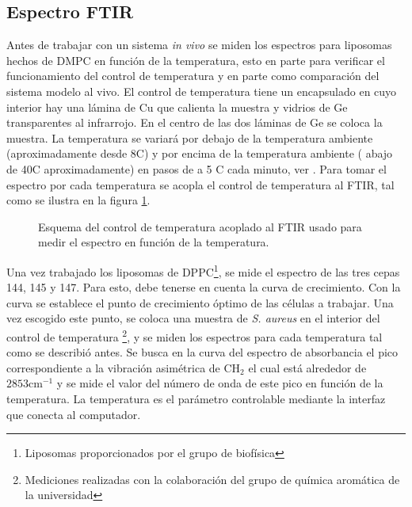 \documentclass[%
 reprint,
 amsmath,amssymb,
 aps,
]{revtex4-1}
\begin{document}
 \subsection{Espectro FTIR}
Antes de trabajar con un sistema \textit{in vivo} se miden los espectros para liposomas hechos de  DMPC en función de la temperatura, esto en parte para verificar el funcionamiento del control de temperatura y en parte como comparación del sistema modelo al vivo. El control de temperatura tiene un encapsulado en cuyo interior hay una lámina de Cu que calienta la muestra y vidrios de Ge transparentes al infrarrojo. En el centro de las dos láminas de Ge se coloca la muestra.  La temperatura se variará por debajo de la temperatura ambiente (aproximadamente desde 8\textdegree C) y por encima de la temperatura ambiente ( abajo de 40\textdegree C aproximadamente) en pasos de a 5 \textdegree C cada minuto, ver \cite{Ocampo2010TheAureus}. Para tomar el espectro por cada temperatura se acopla el control de temperatura al FTIR, tal como se ilustra en la figura \ref{fig:mont2}.\\
\begin{figure}
 
  \caption{Esquema del control de temperatura acoplado al FTIR usado para medir el espectro en función de la temperatura.}
  \label{fig:mont2}
\end{figure}
Una vez trabajado los liposomas de DPPC\footnote{Liposomas proporcionados por el grupo de biofísica}, se mide el espectro de las tres cepas 144, 145 y 147. Para esto, debe tenerse en cuenta la curva de crecimiento. Con la curva se establece el punto de crecimiento óptimo de las células a trabajar. Una vez escogido este punto, se coloca una muestra de \textit{S. aureus} en el interior del control de temperatura \footnote{Mediciones realizadas con la colaboración del grupo de química aromática de la universidad},  y se miden los espectros para cada temperatura tal como se describió antes.
Se busca en la curva del espectro de absorbancia el pico correspondiente a la vibración asimétrica de CH$_{2}$ el cual está alrededor de $2853 \mathrm{cm}^{-1}$ y se mide el valor del número de onda de este pico en función de la temperatura. La temperatura es el parámetro controlable mediante la interfaz que conecta al computador.
\end{document}
